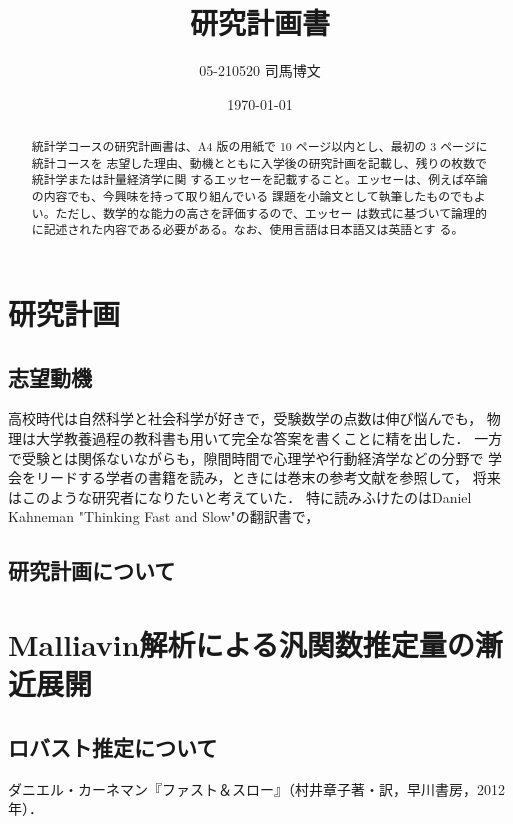 \documentclass[uplatex, dvipdfmx]{jsarticle}
\title{研究計画書}
\author{05-210520 司馬博文}
\date{\today}
\begin{document}
\begin{abstract}
    統計学コースの研究計画書は、A4 版の用紙で 10 ページ以内とし、最初の 3 ページに統計コースを
    志望した理由、動機とともに入学後の研究計画を記載し、残りの枚数で統計学または計量経済学に関
    するエッセーを記載すること。エッセーは、例えば卒論の内容でも、今興味を持って取り組んでいる
    課題を小論文として執筆したものでもよい。ただし、数学的な能力の高さを評価するので、エッセー
    は数式に基づいて論理的に記述された内容である必要がある。なお、使用言語は日本語又は英語とす
    る。
\end{abstract}

\section{研究計画}

\subsection{志望動機}

高校時代は自然科学と社会科学が好きで，受験数学の点数は伸び悩んでも，
物理は大学教養過程の教科書も用いて完全な答案を書くことに精を出した．
一方で受験とは関係ないながらも，隙間時間で心理学や行動経済学などの分野で
学会をリードする学者の書籍を読み，ときには巻末の参考文献を参照して，
将来はこのような研究者になりたいと考えていた．
特に読みふけたのはDaniel Kahneman "Thinking Fast and Slow"の翻訳書\cite{Kahneman}で，


\subsection{研究計画について}

\section{Malliavin解析による汎関数推定量の漸近展開}

\subsection{ロバスト推定について}

\begin{thebibliography}{99}
    ダニエル・カーネマン『ファスト＆スロー』（村井章子著・訳，早川書房，2012年）．
\end{thebibliography}
\end{document}
